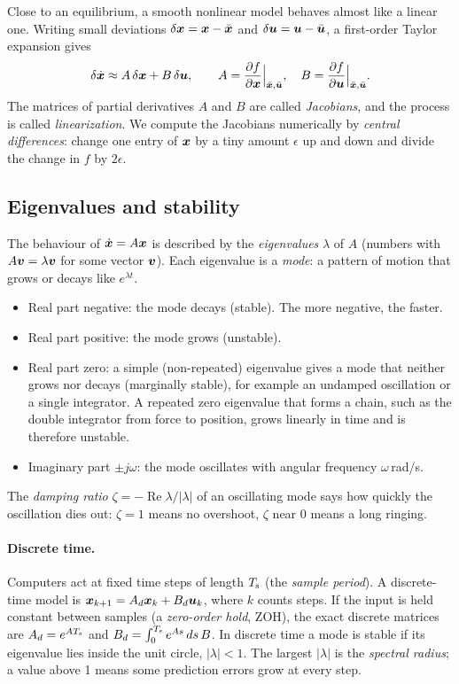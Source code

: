 Close to an equilibrium, a smooth nonlinear model behaves almost like a linear one. Writing small deviations $\delta\boldsymbol{x} = \boldsymbol{x} - \bar{\boldsymbol{x}}$ and $\delta\boldsymbol{u} = \boldsymbol{u} - \bar{\boldsymbol{u}}$, a first-order Taylor expansion gives
\begin{equation}
  \delta\dot{\boldsymbol{x}} \approx A\,\delta\boldsymbol{x} + B\,\delta\boldsymbol{u}, \qquad
  A = \frac{\partial f}{\partial\boldsymbol{x}}\Big|_{\bar{\boldsymbol{x}},\bar{\boldsymbol{u}}}, \quad
  B = \frac{\partial f}{\partial\boldsymbol{u}}\Big|_{\bar{\boldsymbol{x}},\bar{\boldsymbol{u}}} .
\end{equation}
The matrices of partial derivatives $A$ and $B$ are called \emph{Jacobians}, and the process is called \emph{linearization}. We compute the Jacobians numerically by \emph{central differences}: change one entry of $\boldsymbol{x}$ by a tiny amount $\epsilon$ up and down and divide the change in $f$ by $2\epsilon$.

\subsection{Eigenvalues and stability}
The behaviour of $\dot{\boldsymbol{x}}=A\boldsymbol{x}$ is described by the \emph{eigenvalues} $\lambda$ of $A$ (numbers with $A\boldsymbol{v} = \lambda\boldsymbol{v}$ for some vector $\boldsymbol{v}$). Each eigenvalue is a \emph{mode}: a pattern of motion that grows or decays like $e^{\lambda t}$.
\begin{itemize}
  \item Real part negative: the mode decays (stable). The more negative, the faster.
  \item Real part positive: the mode grows (unstable).
  \item Real part zero: a simple (non-repeated) eigenvalue gives a mode that neither grows nor decays (marginally stable), for example an undamped oscillation or a single integrator. A repeated zero eigenvalue that forms a chain, such as the double integrator from force to position, grows linearly in time and is therefore unstable.
  \item Imaginary part $\pm j\omega$: the mode oscillates with angular frequency $\omega$\,rad/s.
\end{itemize}
The \emph{damping ratio} $\zeta = -\operatorname{Re}\lambda/|\lambda|$ of an oscillating mode says how quickly the oscillation dies out: $\zeta=1$ means no overshoot, $\zeta$ near 0 means a long ringing.

\paragraph{Discrete time.} Computers act at fixed time steps of length $T_{\mathrm{s}}$ (the \emph{sample period}). A discrete-time model is $\boldsymbol{x}_{k+1} = A_d\boldsymbol{x}_k + B_d\boldsymbol{u}_k$, where $k$ counts steps. If the input is held constant between samples (a \emph{zero-order hold}, ZOH), the exact discrete matrices are $A_d=e^{AT_{\mathrm{s}}}$ and $B_d = \int_0^{T_{\mathrm{s}}}e^{As}\,ds\,B$. In discrete time a mode is stable if its eigenvalue lies inside the unit circle, $|\lambda|<1$. The largest $|\lambda|$ is the \emph{spectral radius}; a value above 1 means some prediction errors grow at every step.

